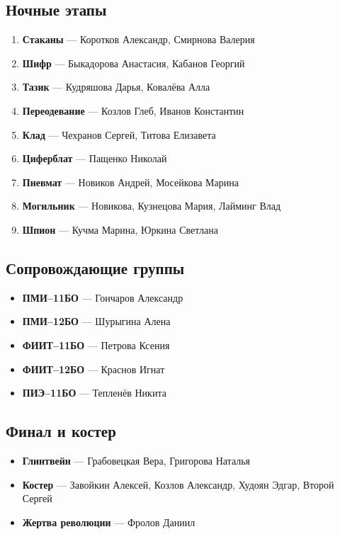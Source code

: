 \subsection*{Ночные этапы}
\begin{enumerate}
\item \textbf{Стаканы} --- Коротков Александр, Смирнова Валерия 
\item \textbf{Шифр} --- Быкадорова Анастасия, Кабанов Георгий 
\item \textbf{Тазик} --- Кудряшова Дарья, Ковалёва Алла 
\item \textbf{Переодевание} --- Козлов Глеб, Иванов Константин 
\item \textbf{Клад} --- Чехранов Сергей, Титова Елизавета 
\item \textbf{Циферблат} --- Пащенко Николай 
\item \textbf{Пневмат} --- Новиков Андрей, Мосейкова Марина
\item \textbf{Могильник} --- Новикова, Кузнецова Мария, Лайминг Влад
\item \textbf{Шпион} --- Кучма Марина, Юркина Светлана 
\end{enumerate}

\subsection*{Сопровождающие группы}
\begin{itemize}
\item \textbf{ПМИ--11БО} --- Гончаров Александр
\item \textbf{ПМИ--12БО} --- Шурыгина Алена
\item \textbf{ФИИТ--11БО} --- Петрова Ксения
\item \textbf{ФИИТ--12БО} --- Краснов Игнат
\item \textbf{ПИЭ--11БО} --- Тепленёв Никита
\end{itemize}

\subsection*{Финал и костер}
\begin{itemize}
\item \textbf{Глинтвейн} --- Грабовецкая Вера, Григорова Наталья
\item \textbf{Костер} --- Завойкин Алексей, Козлов Александр, Худоян Эдгар, Второй Сергей
\item \textbf{Жертва революции} --- Фролов Даниил
\end{itemize}

